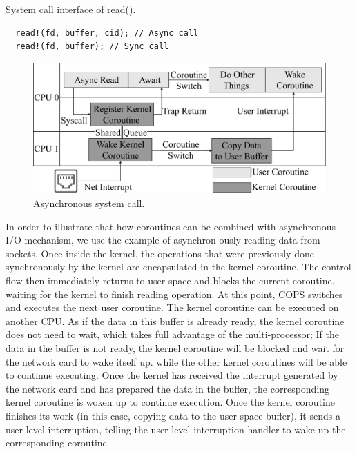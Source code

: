 \documentclass[sigconf,review,anonymous]{acmart}
\begin{document}
\begin{listing}
  \caption{System call interface of read().}
  \label{listing: system call}
  \begin{mdframed}
  \begin{verbatim}
  read!(fd, buffer, cid); // Async call
  read!(fd, buffer); // Sync call
  \end{verbatim}
  \end{mdframed}
\end{listing}

\begin{figure}[h]
  \centering
  \includegraphics[width=\linewidth]{assets/async_syscall.pdf}
  \caption{Asynchronous system call.}
  \label{fig:async_syscall}
\end{figure}

In order to illustrate that how coroutines can be combined with asynchronous I/O mechanism, we use the example of asynchron-ously reading data from sockets. Once inside the kernel, the operations that were previously done synchronously by the kernel are encapsulated in the kernel coroutine. The control flow then immediately returns to user space and blocks the current coroutine, waiting for the kernel to finish reading operation. At this point, COPS switches and executes the next user coroutine. The kernel coroutine can be executed on another CPU. As if the data in this buffer is already ready, the kernel coroutine does not need to wait, which takes full advantage of the multi-processor; If the data in the buffer is not ready, the kernel coroutine will be blocked and wait for the network card to wake itself up. while the other kernel coroutines will be able to continue executing. Once the kernel has received the interrupt generated by the network card and has prepared the data in the buffer, the corresponding kernel coroutine is woken up to continue execution. Once the kernel coroutine finishes its work (in this case, copying data to the user-space buffer), it sends a user-level interruption, telling the user-level interruption handler to wake up the corresponding coroutine.
\end{document}
